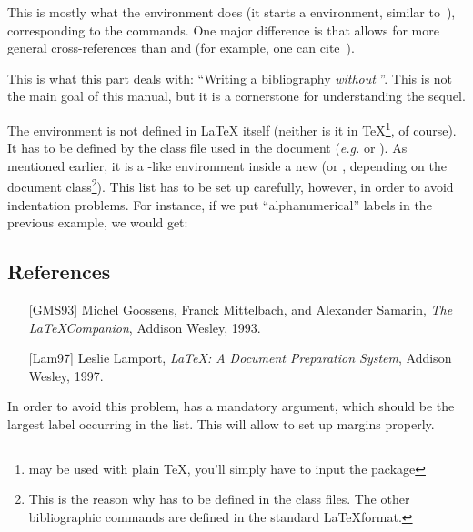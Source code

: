 This is mostly what the  environment does (it
starts a  environment, similar to~), 
 corresponding
to the  commands. One major difference is that  
allows for more general cross-references than  and
 (for example, one can cite~\cite{latex:lc}).


This is what this part deals with: ``Writing a bibliography
\emph{without} \bt''.  This is not the main goal of this manual, but 
it is a cornerstone for understanding the sequel.





The  environment is not defined in \LaTeX
itself (neither is it in \TeX\footnote{\bt may be used with plain \TeX,
you'll simply have to input the  package}, of course). It has
to be defined by the  
class file used in the document (\emph{e.g.}  or
). As mentioned earlier, it is a -like
environment inside a new  (or , depending on
the document class\footnote{This is the reason why 
has to be defined in the class files. The
other bibliographic commands are defined in the standard \LaTeX format.}). 
This list has to be set up carefully, however, in order to avoid indentation
problems. For instance, if we put ``alphanumerical'' labels in the previous
example, we would get:
\begin{myex}
\section*{References}
\begin{enumerate}
\renewcommand\labelenumi{[\theenumi]}
\item[{[GMS93]}] Michel Goossens, Franck Mittelbach, and Alexander
Samarin, \emph{The \LaTeX Companion}, Addison Wesley, 1993.
\item[{[Lam97]}] Leslie Lamport, \emph{\LaTeX: A Document Preparation
System}, Addison Wesley, 1997.
\end{enumerate}
\end{myex}

In order to avoid this problem,  has a mandatory
argument, which should be the largest label occurring in the list. This will
allow to set up margins properly.

